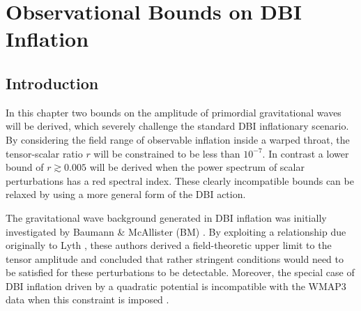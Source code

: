 \renewcommand{\CVSrevision}{\version$Id: dbi.tex,v 1.69 2009/12/07 16:43:29 ith Exp $}

\chapter{Observational Bounds on DBI Inflation}
\label{ch:dbi}
% 
% 
% 
\section{Introduction}
\label{sec:intro-dbi}

In this chapter two bounds on the amplitude of primordial gravitational waves will be derived, which
severely challenge the standard
DBI inflationary scenario. By considering the field range of observable
inflation inside a warped throat, the tensor-scalar ratio $r$ will be
constrained to be less than $10^{-7}$. In contrast a lower bound of $r\gtrsim
0.005$ will be derived when the power spectrum of scalar perturbations has a red
spectral index. These clearly incompatible bounds can be relaxed by using a more
general form of the DBI action.

% 
The gravitational wave background generated in DBI 
inflation was initially investigated by Baumann \& McAllister (BM) 
\cite{bmpaper}. By exploiting a relationship due originally 
to Lyth \cite{lyth}, these authors derived a field-theoretic upper limit 
to the tensor amplitude and concluded that 
rather stringent conditions would need to be satisfied for these 
perturbations to be detectable.      
Moreover, the special case of 
DBI inflation driven by a quadratic potential is incompatible with the WMAP3 
data when this constraint is imposed \cite{bean}.  


